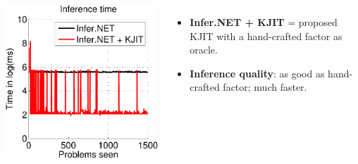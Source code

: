 \documentclass[25pt, a0paper, portrait, margin=0mm, innermargin=10mm,
     blockverticalspace=7mm, colspace=7mm, subcolspace=8mm]{tikzposter} %
\begin{document}
\begin{columns}
{\begin{tikzfigure}
  \hspace{1.8cm}
  \includegraphics[width=11.2cm]{online/cg_inference_time-crop}
\end{tikzfigure}


\begin{itemize}
    \item \textbf{Infer.NET + KJIT} = proposed KJIT with a hand-crafted factor as oracle.
    \item \textbf{Inference quality}: as good as hand-crafted factor; much faster.
\end{itemize}

} %



\end{columns}
\end{document}
